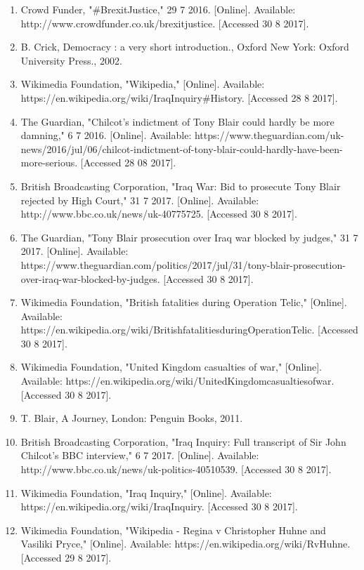 \documentclass[11pt,a4paper]{report}
\begin{document}
\begin{flushleft}
\begin{enumerate}
			\item Crowd Funder, "{\#}BrexitJustice," 29 7 2016. [Online]. Available: http://www.crowdfunder.co.uk/brexitjustice. [Accessed 30 8 2017].
			\item B. Crick, Democracy : a very short introduction., Oxford New York: Oxford University Press., 2002. 
			\item Wikimedia Foundation, "Wikipedia," [Online]. Available: https://en.wikipedia.org/wiki/Iraq{\textunderscore}Inquiry{\#}History. [Accessed 28 8 2017].
			\item The Guardian, "Chilcot's indictment of Tony Blair could hardly be more damning," 6 7 2016. [Online]. Available: https://www.theguardian.com/uk-news/2016/jul/06/chilcot-indictment-of-tony-blair-could-hardly-have-been-more-serious. [Accessed 28 08 2017].
			\item British Broadcasting Corporation, "Iraq War: Bid to prosecute Tony Blair rejected by High Court," 31 7 2017. [Online]. Available: http://www.bbc.co.uk/news/uk-40775725. [Accessed 30 8 2017].
			\item The Guardian, "Tony Blair prosecution over Iraq war blocked by judges," 31 7 2017. [Online]. Available: https://www.theguardian.com/politics/2017/jul/31/tony-blair-prosecution-over-iraq-war-blocked-by-judges. [Accessed 30 8 2017].
			\item Wikimedia Foundation, "British fatalities during Operation Telic," [Online]. Available: https://en.wikipedia.org/wiki/British{\textunderscore}fatalities{\textunderscore}during{\textunderscore}Operation{\textunderscore}Telic. [Accessed 30 8 2017].
			\item Wikimedia Foundation, "United Kingdom casualties of war," [Online]. Available: https://en.wikipedia.org/wiki/United{\textunderscore}Kingdom{\textunderscore}casualties{\textunderscore}of{\textunderscore}war. [Accessed 30 8 2017].
			\item T. Blair, A Journey, London: Penguin Books, 2011. 
			\item British Broadcasting Corporation, "Iraq Inquiry: Full transcript of Sir John Chilcot's BBC interview," 6 7 2017. [Online]. Available: http://www.bbc.co.uk/news/uk-politics-40510539. [Accessed 30 8 2017].
			\item Wikimedia Foundation, "Iraq Inquiry," [Online]. Available: https://en.wikipedia.org/wiki/Iraq{\textunderscore}Inquiry. [Accessed 30 8 2017].
			\item Wikimedia Foundation, "Wikipedia - Regina v Christopher Huhne and Vasiliki Pryce," [Online]. Available: https://en.wikipedia.org/wiki/R{\textunderscore}v{\textunderscore}Huhne. [Accessed 29 8 2017].

\end{enumerate}
\end{flushleft}
\end{document}
